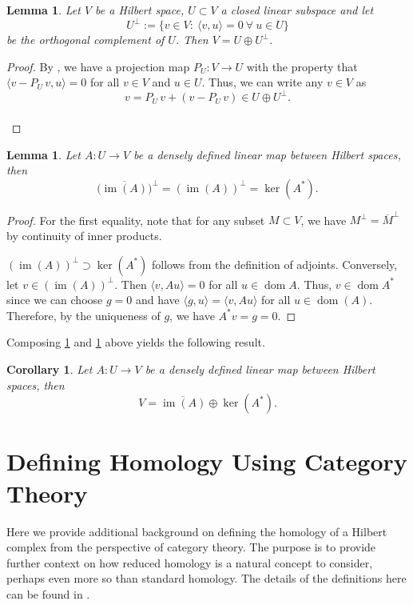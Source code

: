 \documentclass[11pt]{article}
\newtheorem{cor}[theorem]{Corollary}
\newtheorem{lemma}[theorem]{Lemma}
\theoremstyle{definition}
\theoremstyle{remark}
\DeclareMathOperator\dom{dom}
\DeclareMathOperator{\im}{im}
\begin{document}
\begin{appendices}
\begin{lemma}\label{lem:orthogonal_decomposition}
    Let $V$ be a Hilbert space, $U\subset V$ a closed linear subspace and let $$U^\perp:=\{v \in V: \ \langle v,u \rangle=0 \ \forall\ u \in U \}$$ be the orthogonal complement of $U$. Then 
    $
        V=U \oplus U^\perp.
    $
\end{lemma}

\begin{proof}
     By \citet[Corollary 5.4]{funcana}, we have a projection map $P_U:V \rightarrow U$ with the property that $\langle v - P_U \, v,u \rangle =0$ for all $v \in V$ and $u \in U$. Thus, we can write any $v \in V$ as $$v=P_U \, v + (v-P_U\, v) \in U \oplus U^\perp.$$ \vspace{-1.35cm}\\
\end{proof}

\begin{lemma}\label{lem:imperp} 
Let $A:U \rightarrow V$ be a densely defined linear map between Hilbert spaces, then
    $$
    \Big(\overline{\im(A)}\Big)^\perp=(\im(A))^\perp = \ker(A^*).
    $$ 
\end{lemma}
\begin{proof}
    For the first equality, note that for any subset $M \subset V$, we have $M^\perp=\overline M^\perp$ by continuity of inner products.
    
    $(\im(A))^\perp \supset \ker(A^*)$ follows from the definition of adjoints. Conversely, let $v\in(\im (A))^\perp$. Then $\langle v,Au \rangle=0$ for all $u\in\dom A$. Thus, $v\in\dom A^*$ since we can choose $g=0$ and have $\langle g,u \rangle=\langle v,Au \rangle$ for all $u \in \dom(A)$. Therefore, by the uniqueness of $g$, we have $A^*v=g=0$.
\end{proof}

Composing \cref{lem:orthogonal_decomposition} and \cref{lem:imperp} above yields the following result.
\begin{cor}\label{cor:decompV}
    Let $A:U \rightarrow V$ be a densely defined linear map between Hilbert spaces, then
    $$V=\overline{\im(A)} \oplus \ker(A^*).$$
\end{cor}


\section{Defining Homology Using Category Theory}
\label{appendix:category}

Here we provide additional background on defining the homology of a Hilbert complex from the perspective of category theory. The purpose is to provide further context on how reduced homology is a natural concept to consider, perhaps even more so than standard homology. The details of the definitions here can be found in \citet{maclane}. 


\end{appendices}
\end{document}
